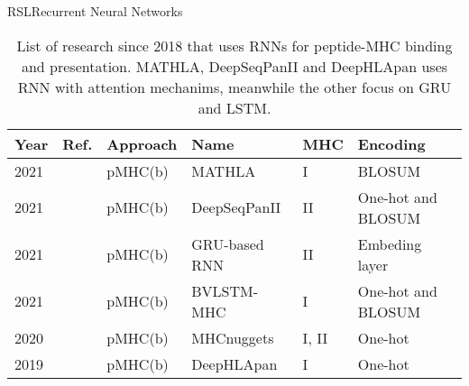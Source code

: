 \documentclass[10pt]{beamer}
\newcommand{\1}{
	\setbeamertemplate{background}{
		\texttt{[image: img/1]}
		\tikz[overlay] \fill[fill opacity=0.75,fill=white] (0,0) rectangle (-\paperwidth,\paperheight);
	}
}
\begin{document}
\begin{frame}{RSL}{Recurrent Neural Networks}
	
	\fontsize{8pt}{5pt}\selectfont
	
	\begin{table}[]
		\centering
		\caption{List of research since 2018 that uses RNNs for peptide-MHC binding and presentation. MATHLA, DeepSeqPanII and DeepHLApan uses RNN with attention mechanims, meanwhile the other focus on GRU and LSTM.}		
		\setlength{\tabcolsep}{0.5em} %
		{\renewcommand{\arraystretch}{2}%
			\begin{tabular}{p{0.6cm}p{0.6cm}p{1.5cm}p{2cm}p{0.6cm}p{2.7cm}}
				\textbf{Year} & \textbf{Ref.}                               & \textbf{Approach}   & \textbf{Name} & \textbf{MHC} & \textbf{Encoding}                                                                                                                                                                                                                         \\ \hline
				2021          & \cite{ye2021mathla}        & pMHC(b) & MATHLA        & I        & BLOSUM                      \\
				
				2021          & \cite{liu2021deepseqpanii} & pMHC(b)                     & DeepSeqPanII                      & II       & One-hot  and BLOSUM                                                    \\
				
				2021          & \cite{heng2021simple}      & pMHC(b)                     & GRU-based RNN                     & II       & Embeding layer                                                        \\
				
				2021          & \cite{jiang2021predicting} & pMHC(b)                     & BVLSTM-MHC                        & I        & One-hot  and BLOSUM                                                                        \\
				
				2020          & \cite{shao2020high}        & pMHC(b)                     & MHCnuggets                        & I, II & One-hot                \\
				
				2019          & \cite{wu2019deephlapan}    & pMHC(b)                     & DeepHLApan                        & I        & One-hot                     
			\end{tabular}
		}
	\end{table}	
\end{frame}
\end{document}
